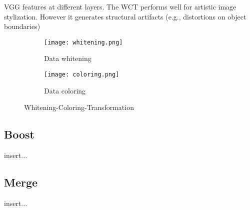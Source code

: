 VGG features at different layers.
The WCT performs well for artistic image stylization. However it generates
structural artifacts (e.g., distortions on object boundaries)
\begin{figure}[h!]
	\centering
	\begin{subfigure}[b]{0.4\linewidth}
	\texttt{[image: whitening.png]}
		\caption{Data whitening}
		\end{subfigure}
	\begin{subfigure}[b]{0.4\linewidth}
	\texttt{[image: coloring.png]}
	\caption{Data coloring}
	\end{subfigure}
	\caption{Whitening-Coloring-Transformation}
	\label{fig:WCT}
\end{figure}


\subsection{Boost}
insert...

\subsection{Merge}
insert...